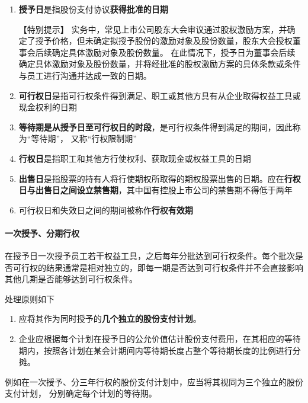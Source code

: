 \documentclass[UTF8,12pt]{ctexart}
\numberwithin{equation}{section} %
\numberwithin{figure}{section}
\numberwithin{table}{section}
\begin{document}
	\begin{enumerate}
		\item \textbf{授予日}是指股份支付协议\textbf{获得批准的日期}
		
		【特别提示】
		实务中，常见上市公司股东大会审议通过股权激励方案，并确定了授予价格，但未确定拟授予股份的激励对象及股份数量，股东大会授权董事会后续确定具体激励对象及股份数量。
		在此情况下，授予日为董事会后续确定具体激励对象及股份数量，并将经批准的股权激励方案的具体条款或条件与员工进行沟通并达成一致的日期。
		
		\item \textbf{可行权日}是指可行权条件得到满足、职工或其他方具有从企业取得权益工具或现金权利的日期
		
		\item \textbf{等待期是从授予日至可行权日的时段}，是可行权条件得到满足的期间，因此称为“等待期”， 又称“行权限制期”
		
		\item \textbf{行权日}是指职工和其他方行使权利、获取现金或权益工具的日期
		
		\item \textbf{出售日}是指股票的持有人将行使期权所取得的期权股票出售的日期。应在\textbf{行权日与出售日之间设立禁售期}，其中国有控股上市公司的禁售期不得低于两年
		
		\item 可行权日和失效日之间的期间被称作\textbf{行权有效期}
	\end{enumerate}

	\paragraph{一次授予、分期行权}在授予日一次授予员工若干权益工具，之后每年分批达到可行权条件。每个批次是否可行权的结果通常是相对独立的，即每一期是否达到可行权条件并不会直接影响其他几期是否能够达到可行权条件。
	
	处理原则如下
	\begin{enumerate}
		\item 应将其作为同时授予的\textbf{几个独立的股份支付计划}。
		
		\item 企业应根据每个计划在授予日的公允价值估计股份支付费用，在其相应的等待期内，按照各计划在某会计期间内等待期长度占整个等待期长度的比例进行分摊。
	\end{enumerate}

	例如在一次授予、分三年行权的股份支付计划中，应当将其视同为三个独立的股份支付计划， 分别确定每个计划的等待期。
	
\end{document}
